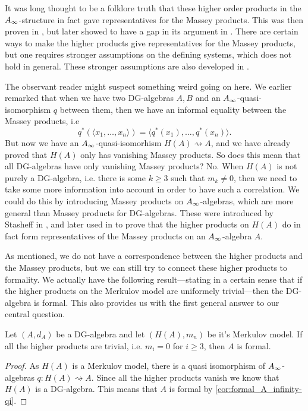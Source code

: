 It was long thought to be a folklore truth that these higher order products in the $A_{\infty}$-structure in fact gave representatives for the Massey products. This was then proven in \cite{Ext}, but later showed to have a gap in its argument in \cite{detection}. There are certain ways to make the higher products give representatives for the Massey products, but one requires stronger assumptions on the defining systems, which does not hold in general. These stronger assumptions are also developed in \cite{detection}. 

\begin{remark}
The observant reader might suspect something weird going on here. We earlier remarked that when we have two DG-algebras $A, B$ and an $A_{\infty}$-quasi-isomorphism $q$ between them, then we have an informal equality between the Massey products, i.e 
\begin{equation*}
	q^*(\langle x_1, \ldots, x_n\rangle ) = \langle q^*(x_1),\ldots, q^*(x_n)\rangle .
\end{equation*}
But now we have an $A_{\infty}$-quasi-isomorhism $H(A)\rightsquigarrow A$, and we have already proved that $H(A)$ only has vanishing Massey products. So does this mean that all DG-algebras have only vanishing Massey products? No. When $H(A)$ is not purely a DG-algebra, i.e. there is some $k\geq 3$ such that $m_k\neq 0$, then we need to take some more information into account in order to have such a correlation. We could do this by introducing Massey products on $A_{\infty}$-algebras, which are more general than Massey products for DG-algebras. These were introduced by Stasheff in \cite{h-spaces}, and later used in \cite{infty-massey} to prove that the higher products on $H(A)$ do in fact form representatives of the Massey products on an $A_{\infty}$-algebra $A$.
\end{remark}

As mentioned, we do not have a correspondence between the higher products and the Massey products, but we can still try to connect these higher products to formality. We actually have the following result---stating in a certain sense that if the higher products on the Merkulov model are uniformely trivial---then the DG-algebra is formal. This also provides us with the first general answer to our central question.

\begin{theorem}
\label{thm:formal_iff_no_infty_massey}
Let $(A, d_A)$ be a DG-algebra and let $(H(A), m_n)$ be it's Merkulov model. If all the higher products are trivial, i.e. $m_i = 0$ for $i\geq 3$, then $A$ is formal. 
\end{theorem}
\begin{proof}
As $H(A)$ is a Merkulov model, there is a quasi isomorphism of $A_{\infty}$-algebras $q:H(A)\rightsquigarrow A$. Since all the higher products vanish we know that $H(A)$ is a DG-algebra. This means that $A$ is formal by \cref{cor:formal_A_infinity-qi}. 
\end{proof}

